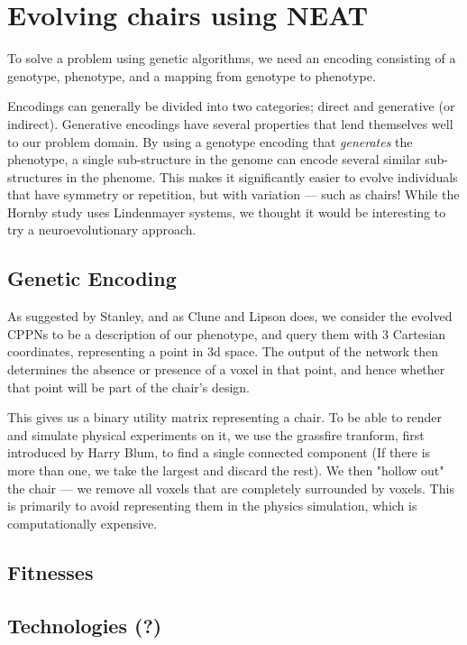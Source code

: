 \section{Evolving chairs using NEAT}
To solve a problem using genetic algorithms, we need an encoding
consisting of a genotype, phenotype, and a mapping from genotype to phenotype.

Encodings can generally be divided into two categories; direct and generative
(or indirect). Generative encodings have several properties that lend themselves
well to our problem domain. By using a genotype encoding that \emph{generates}
the phenotype, a single sub-structure in the genome can encode several similar
sub-structures in the phenome. This makes it significantly easier to evolve
individuals that have symmetry or repetition, but with variation --- such as
chairs! While the Hornby study\cite{paper:ev4} uses Lindenmayer
systems\cite{Hornby2003}, we thought it would be interesting to try a
neuroevolutionary approach.

\subsection{Genetic Encoding}
As suggested by Stanley\cite{Stanley2007}, and as Clune and
Lipson\cite{Clune:2011:EOG:2078245.2078246} does, we consider the evolved CPPNs
to be a description of our phenotype, and query them with 3 Cartesian
coordinates, representing a point in 3d space. The output of the network then
determines the absence or presence of a voxel in that point, and hence whether
that point will be part of the chair's design.

This gives us a binary utility matrix representing a chair. To be able to render
and simulate physical experiments on it, we use the grassfire tranform, first
introduced by Harry Blum\cite{blum67}, to find a single connected component (If
there is more than one, we take the largest and discard the rest). We then
"hollow out" the chair --- we remove all voxels that are completely surrounded by
voxels. This is primarily to avoid representing them in the physics simulation,
which is computationally expensive.

\subsection{Fitnesses}
\subsection{Technologies (?)}

